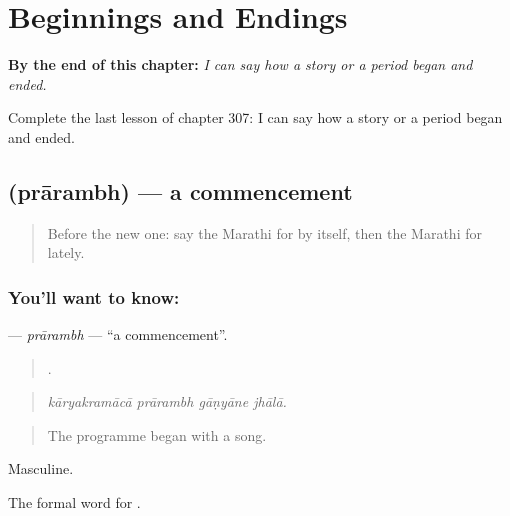 
\chapter{Beginnings and Endings}
\label{ch:mr-beginnings-and-endings}

\begin{chapteropening}
\textbf{By the end of this chapter:} \emph{I can say how a story or a period began and ended.}

Complete the last lesson of chapter 307: I can say how a story or a period began and ended.
\end{chapteropening}

\section[\texorpdfstring{\mr{प्रारंभ} (prārambh)}{प्रारंभ (prārambh)}]{ (prārambh) — a commencement}

\label{lesson:MR-C307-prarambh}



\begin{quote}
Before the new one: say the Marathi for by itself, then the Marathi for lately.
\end{quote}

\subsection*{You'll want to know: }
\textbf{} — \emph{prārambh} — \textquotedblleft{}a commencement\textquotedblright{}.

\begin{quote}
   .
\end{quote}

\begin{quote}
\emph{kāryakramācā prārambh gāṇyāne jhālā.}
\end{quote}

\begin{quote}
The programme began with a song.
\end{quote}

Masculine.

The formal word for .

